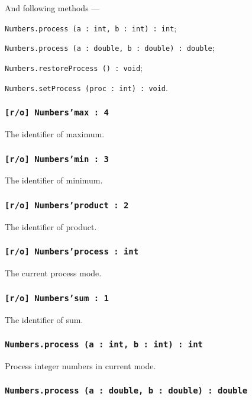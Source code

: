 And following methods —
\begin{icItems}
	\item \texttt{Numbers.process (a : int, b : int) : int};
	\item \texttt{Numbers.process (a : double, b : double) : double};
	\item \texttt{Numbers.restoreProcess () : void};
	\item \texttt{Numbers.setProcess (proc : int) : void}.
\end{icItems}

\subsubsection{\texttt{[r/o] Numbers'max : 4}}

The identifier of maximum.

\subsubsection{\texttt{[r/o] Numbers'min : 3}}

The identifier of minimum.

\subsubsection{\texttt{[r/o] Numbers'product : 2}}

The identifier of product.

\subsubsection{\texttt{[r/o] Numbers'process : int}}

The current process mode.

\subsubsection{\texttt{[r/o] Numbers'sum : 1}}

The identifier of sum.

\subsubsection{\texttt{Numbers.process (a : int, b : int) : int}}

Process integer numbers in current mode.

\subsubsection{\texttt{Numbers.process (a : double, b : double) : double}}

